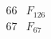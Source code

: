 \documentclass{article}
\begin{document}
{$$\begin{array}{|r|*{7}{r|}}
 & 
 & 
 & 
 & 
\\
\hline
66 
 & F_{126} &
 & 
 & 
 & 
 & 
 & 
\\
\hline
67 
 & F_{67} &
 & 
 & 
 & 
 & 
 & 

\end{array}$$}
\end{document}
